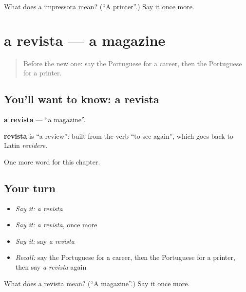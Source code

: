 \begin{tcolorbox}[breakable,colback=teal!4,colframe=teal!35!black,title={Before you move on}]
What does a impressora mean? (\textquotedblleft{}A printer\textquotedblright{}.) Say it once more.
\end{tcolorbox}
\section[a revista]{a revista — a magazine}

\label{lesson:PT-C200-revista}



\begin{quote}
Before the new one: say the Portuguese for a career, then the Portuguese for a printer.
\end{quote}

\subsection*{You'll want to know: a revista}
\textbf{a revista} — \textquotedblleft{}a magazine\textquotedblright{}.

\begin{cousinweb}
\textbf{revista} is \textquotedblleft{}a review\textquotedblright{}: built from the verb \textquotedblleft{}to see again\textquotedblright{}, which goes back to Latin \emph{revidere}.
\end{cousinweb}

\begin{grammarlens}[title={What you've built}]
One more word for this chapter.
\end{grammarlens}

\subsection*{Your turn}
\begin{itemize}
\raggedright
  \item \emph{Say it:} \emph{a revista}
  \item \emph{Say it:} \emph{a revista}, once more
  \item \emph{Say it:} say \emph{a revista}
  \item \emph{Recall:} say the Portuguese for a career, then the Portuguese for a printer, then say \emph{a revista} again
\end{itemize}

\begin{tcolorbox}[breakable,colback=teal!4,colframe=teal!35!black,title={Before you move on}]
What does a revista mean? (\textquotedblleft{}A magazine\textquotedblright{}.) Say it once more.
\end{tcolorbox}
